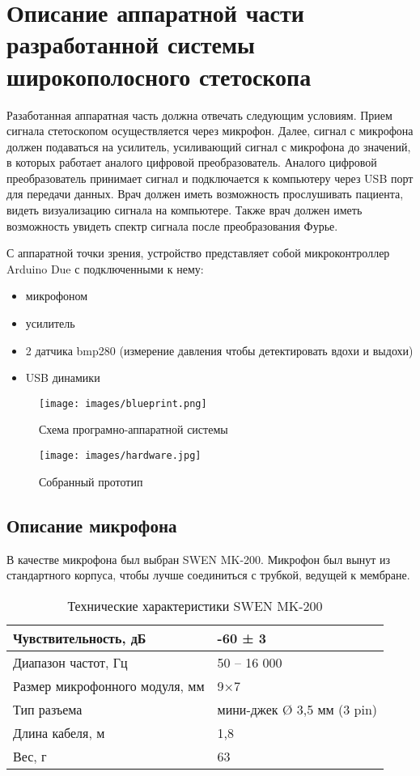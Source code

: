 \documentclass[../main.tex]{subfiles}
\begin{document}
\section{Описание аппаратной части разработанной системы широкополосного стетоскопа}

Разаботанная аппаратная часть должна отвечать следующим условиям. Прием сигнала стетоскопом осуществляется через микрофон. Далее, сигнал с микрофона должен подаваться на усилитель, усиливающий сигнал с микрофона до значений, в которых работает аналого цифровой преобразователь. Аналого цифровой преобразователь принимает сигнал и подключается к компьютеру через USB порт для передачи данных. Врач должен иметь возможность прослушивать пациента, видеть визуализацию сигнала на компьютере. Также врач должен иметь возможность увидеть спектр сигнала после преобразования Фурье.

С аппаратной точки зрения, устройство представляет собой микроконтроллер Arduino Due с подключенными к нему:
\begin{itemize}
\item микрофоном
\item усилитель
\item 2 датчика bmp280 (измерение давления чтобы детектировать вдохи и выдохи)
\item USB динамики
\end{itemize}

\begin{figure}[H]
\centering
\texttt{[image: images/blueprint.png]}
\caption{Схема програмно-аппаратной системы}
\end{figure}

\begin{figure}[H]
\centering
\texttt{[image: images/hardware.jpg]}
\caption{Собранный прототип}
\end{figure}

\subsection{Описание микрофона}
В качестве микрофона был выбран SWEN MK-200. Микрофон был вынут из стандартного корпуса, чтобы лучше соединиться с трубкой, ведущей к мембране. \\

\begin{table}[h]
\centering
\caption{Технические характеристики SWEN MK-200}
\begin{tabular}{|l|l|}
\hline
Чувствительность, дБ           & -60 ± 3                    \\ \hline
Диапазон частот, Гц            & 50 – 16 000                \\ \hline
Размер микрофонного модуля, мм & 9×7                        \\ \hline
Тип разъема                    & мини-джек Ø 3,5 мм (3 pin) \\ \hline
Длина кабеля, м                & 1,8                        \\ \hline
Вес, г                         & 63                         \\ \hline
\end{tabular}
\end{table}
\end{document}
